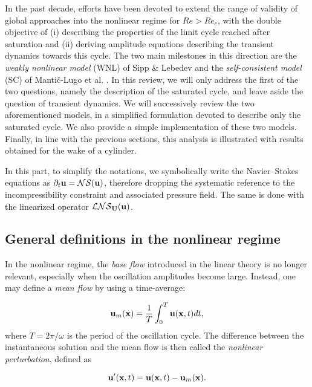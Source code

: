 \documentclass[twocolumn,10pt]{asme2ej}
\newcommand{\be}[1]{ \begin{equation} \label{#1}}
\newcommand{\ee}{\end{equation}}
\begin{document}
In the past decade, efforts have been devoted to extend the range of validity of global approaches into the nonlinear regime for $Re>Re_c$, with the double objective of (i) describing the properties of the limit cycle reached after saturation and (ii) deriving amplitude equations describing the transient dynamics towards this cycle.
The two main milestones in this direction are the {\em weakly nonlinear model} (WNL) of Sipp \& Lebedev \cite{SippLebedev} and the {\em self-consistent model} (SC) of Manti\v{c}-Lugo et al. \cite{MLugo2014}.
In this review, we will only address the first of the two questions, namely  the description of the saturated cycle, and leave aside the question of transient dynamics. We will successively review the two aforementioned models, in a simplified formulation devoted to describe only the saturated cycle. We also provide a simple implementation of these two models. Finally, in line with the previous sections, this analysis is illustrated with results obtained for the wake of a cylinder.
  
 In this part, to simplify the notations, we symbolically write the Navier--Stokes equations as $\partial_t {\bf u} = {\cal NS} ({\bf u})$, therefore dropping the systematic reference to the incompressibility constraint and associated pressure field.
The same is done with the linearized operator ${\cal LNS}_{{\bf U}}( {\bf u})$. 

\subsection{General definitions in the nonlinear regime}

In the nonlinear regime, the {\em base flow} introduced in the linear theory is no longer relevant, especially when the oscillation amplitudes become large.
Instead, one may define a {\em mean flow} by using a time-average: 

\be{defumean}
{\bf u}_m({\bf x})  = \frac{1}{T} \int_0^{T}  {\bf u}({\bf x},t)  dt,
\ee
where $T = 2\pi/\omega$  is the period of the oscillation cycle. The difference between the instantaneous solution and the mean flow is then called the {\em nonlinear perturbation}, defined as 

\be{defuprime}
{\bf u}'({\bf x},t) =   {\bf u}({\bf x},t)-  {\bf u}_m({\bf x}).
\ee
\end{document}
